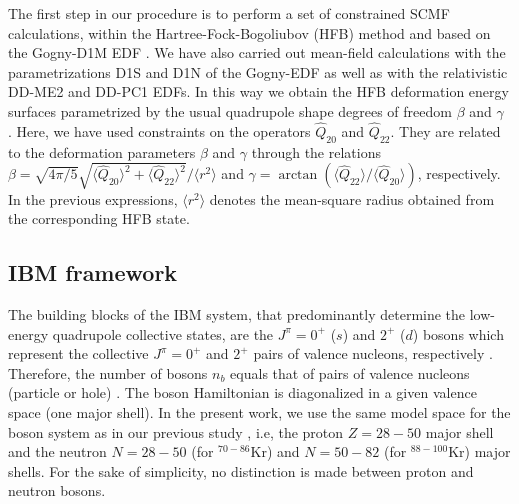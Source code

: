\documentclass[twocolumn,showpacs,amsmath,amssymb,superscriptaddress]{revtex4-1}
\begin{document}
The first step in our procedure is to perform a set of constrained SCMF 
calculations, within the Hartree-Fock-Bogoliubov (HFB) method and based 
on the Gogny-D1M EDF \cite{rayner2010pt}. We have also carried out 
mean-field calculations with the  parametrizations D1S \cite{D1S} and 
D1N \cite{D1N}  of the Gogny-EDF as well as with the relativistic 
DD-ME2 \cite{lalazissis2005} and DD-PC1 \cite{DDPC1} EDFs. In this way 
we obtain the HFB deformation energy surfaces parametrized by the usual 
quadrupole shape degrees of freedom $\beta$ and $\gamma$ \cite{BM}. 
Here, we have used constraints on the operators $\hat Q_{20}$ and $\hat 
Q_{22}$. They are related to the deformation parameters $\beta$ and 
$\gamma$ through the relations $\beta=\sqrt{4\pi/5}\sqrt{\langle\hat 
Q_{20}\rangle^2+\langle\hat Q_{22}\rangle^2}/\langle r^2\rangle$ and 
$\gamma=\arctan{(\langle\hat Q_{22}\rangle/\langle\hat 
Q_{20}\rangle)}$, respectively. In the previous expressions, $\langle 
r^2\rangle$ denotes the mean-square radius obtained from the 
corresponding  HFB state. 



\subsection{IBM framework}
\label{IBM-Hamilt-Rayner}

The building blocks of the IBM system, that predominantly determine the 
low-energy quadrupole collective states, are the $J^{\pi}=0^+$ ($s$) 
and $2^+$ ($d$) bosons which represent the collective $J^{\pi}=0^+$ and 
$2^+$ pairs of valence nucleons, respectively \cite{IBM,OAI}. 
Therefore, the number of bosons $n_b$ equals that of pairs of valence 
nucleons (particle or hole) \cite{IBM,OAI}.  The boson Hamiltonian is 
diagonalized in a given valence space (one major shell). In the present 
work, we use the same model space for the boson system as in our 
previous study \cite{nomura2017ge}, i.e, the proton $Z=28-50$ major 
shell and the neutron $N=28-50$ (for $^{70-86}$Kr) and $N=50-82$ (for 
$^{88-100}$Kr) major shells. For the sake of simplicity, no distinction 
is made  between proton and neutron bosons. 
\end{document}
